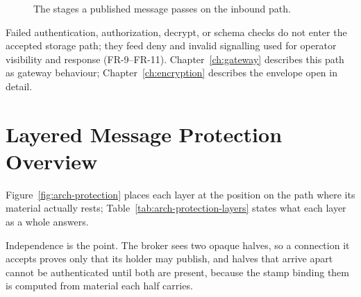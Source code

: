 \documentclass[12pt,a4paper]{report}
\begin{document}
\begin{figure}[htbp]
{%
}
\caption{The stages a published message passes on the
inbound path.}
\label{fig:arch-datapath}
\end{figure}

Failed authentication, authorization, decrypt, or schema
checks do not enter the accepted storage path; they feed
deny and invalid signalling used for operator visibility
and response (FR-9--FR-11). Chapter~\ref{ch:gateway}
describes this path as gateway behaviour;
Chapter~\ref{ch:encryption} describes the envelope open
in detail.

\section{Layered Message Protection Overview}
\label{sec:arch-protection}

Figure~\ref{fig:arch-protection} places each layer at the
position on the path where its material actually rests;
Table~\ref{tab:arch-protection-layers} states what each
layer as a whole answers.

Independence is the point. The broker sees two opaque
halves, so a connection it accepts proves only that its
holder may publish, and halves that arrive apart cannot be
authenticated until both are present, because the stamp
binding them is computed from material each half carries.
\end{document}
